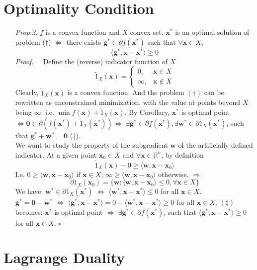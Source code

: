 \documentclass[a4paper, 11pt]{book}
\begin{document}
\section{Optimality Condition}
\begin{itemize}
  \item[\textit{Prop.2.}] $f$ is a convex function and $X$ convex set. $\bm{x}^*$ is an optimal solution of problem ($\dag$) $\iff$ there exists $\bm{g}^* \in \partial f(\bm{x}^*)$ such that $\forall \bm{x}\in X$,
  \begin{equation}\label{eq:opt1}
    \langle \bm{g}^*, \bm{x-x}^* \rangle \geq 0
  \end{equation}
  \textit{Proof.~~} Define the (reverse) indicator function of $X$
  \begin{equation}
    \tilde{1}_X (\bm{x}) = \begin{cases}
    0, &\bm{x}\in X\\
    \infty, &\bm{x} \notin X
    \end{cases}
  \end{equation}
  Clearly, $\tilde{1}_X (\bm{x})$ is a convex function. And the problem $(\dag)$ can be rewritten as unconstrained minimization, with the value at points beyond $X$ being $\infty$; i.e. $\min f(\bm{x}) + \tilde{1}_X (\bm{x})$. By Corollary, $\bm{x}^*$ is optimal point $\iff \bm{0} \in \partial (f(\bm{x}^*)+\tilde{1}_X(\bm{x}^*)) \iff$ $\exists \bm{g}^*\in \partial f(\bm{x}^*), \exists \bm{w}^*\in \partial \tilde{1}_X(\bm{x}^*)$, such that $\bm{g}^*+\bm{w}^*=\bm{0}$ ($\ddag$).\\

  We want to study the property of the subgradient $\bm{w}$ of the artificially defined indicator. At a given point $\bm{x}_0 \in X$ and $\forall \bm{x}\in \mathbb{R}^n$, by definition
  $$
  \tilde{1}_X (\bm{x}) - 0 \geq \langle \bm{w}, \bm{x-x}_0 \rangle
  $$
  I.e. $0 \geq \langle \bm{w}, \bm{x-x}_0 \rangle$ if $\bm{x}\in X$; $\infty \geq \langle \bm{w}, \bm{x-x}_0 \rangle$ otherwise. $\Rightarrow$ 
  $$
  \partial 1_X(\bm{x}_0) = \{\bm{w}:  \langle \bm{w}, \bm{x-x}_0 \rangle \leq 0, \forall \bm{x}\in X\}$$
  We have: $\bm{w}^* \in \partial 1_X(\bm{x}^*)$ $\iff$ $\langle \bm{w}^*, \bm{x-x}^* \rangle \leq 0$ for all $\bm{x}\in X$. \\
  $\bm{g}^* = \bm{0} - \bm{w}^*$ $\iff$ $\langle \bm{g}^*, \bm{x-x}^* \rangle = 0 - \langle \bm{w}^*, \bm{x-x}^* \rangle \geq 0$ for all $\bm{x}\in X$. $(\ddag)$ becomes: $\bm{x}^*$ is optimal point $\iff$ $\exists \bm{g}^*\in \partial f(\bm{x}^*)$, such that $\langle \bm{g}^*, \bm{x-x}^* \rangle \geq 0$ for all $\bm{x}\in X$. $\square$
\end{itemize}


\section{Lagrange Duality}
\end{document}
